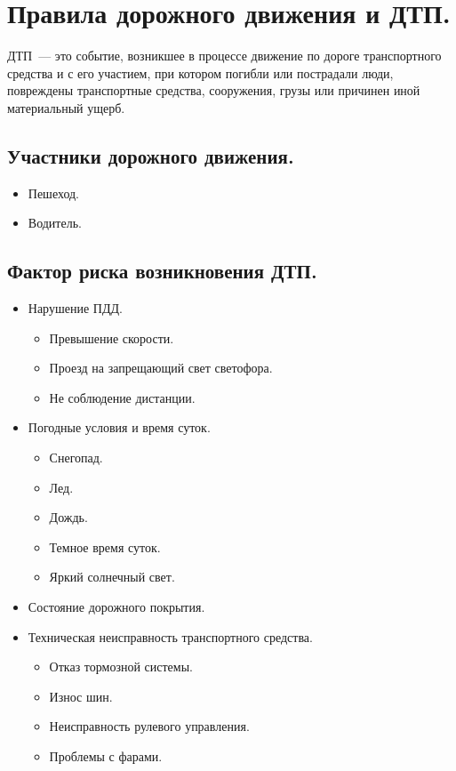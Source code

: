 \documentclass[12pt]{article}
\begin{document}
	\tableofcontents
	\setcounter{tocdepth}{3}
	\newpage
	\section{Правила дорожного движения и ДТП.}
	\begin{definition}
		ДТП~--- это событие, возникшее в процессе движение по дороге транспортного средства и с его участием, при котором погибли или пострадали люди, повреждены транспортные средства, сооружения, грузы или причинен иной материальный ущерб.
	\end{definition}
	\subsection{Участники дорожного движения.}
	\begin{itemize}
		\item Пешеход.
		\item Водитель.
	\end{itemize}
	\subsection{Фактор риска возникновения ДТП.}
	\begin{itemize}
		\item Нарушение ПДД.
		\begin{itemize}
			\item Превышение скорости.
			\item Проезд на запрещающий свет светофора.
			\item Не соблюдение дистанции.
		\end{itemize}
		\item Погодные условия и время суток.
		\begin{itemize}
			\item Снегопад.
			\item Лед.
			\item Дождь.
			\item Темное время суток.
			\item Яркий солнечный свет.
		\end{itemize}
		\item Состояние дорожного покрытия.
		\item Техническая неисправность транспортного средства.
		\begin{itemize}
			\item Отказ тормозной системы.
			\item Износ шин.
			\item Неисправность рулевого управления.
			\item Проблемы с фарами.
		\end{itemize}
	\end{itemize}
\end{document}
